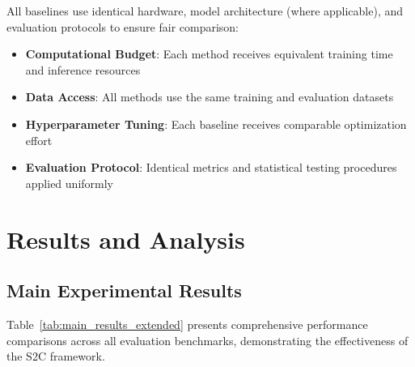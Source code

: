 \documentclass[10pt,twocolumn]{article}
\newcommand{\ssc}{\textsc{S2C}}
\begin{document}
All baselines use identical hardware, model architecture (where applicable), and evaluation protocols to ensure fair comparison:

\begin{itemize}[leftmargin=*]
\item \textbf{Computational Budget}: Each method receives equivalent training time and inference resources
\item \textbf{Data Access}: All methods use the same training and evaluation datasets
\item \textbf{Hyperparameter Tuning}: Each baseline receives comparable optimization effort
\item \textbf{Evaluation Protocol}: Identical metrics and statistical testing procedures applied uniformly
\end{itemize}

\section{Results and Analysis} \label{sec:results}

\subsection{Main Experimental Results}

Table~\ref{tab:main_results_extended} presents comprehensive performance comparisons across all evaluation benchmarks, demonstrating the effectiveness of the \ssc{} framework.
\end{document}
